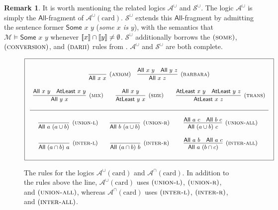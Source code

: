 \documentclass[letterpaper]{article} %
\theoremstyle{definition}
\newtheorem{remark}[theorem]{Remark}
\newcommand{\semantics}[1]{[\![\mbox{\em $ #1 $\/}]\!]}
\newcommand{\Model}{\mathcal{M}}
\newcommand{\Aunion}{\mathscr{A}^{\cup}}
\newcommand{\Sunion}{\mathscr{S}^{\cup}}
\newcommand{\Ainter}{\mathscr{A}^{\cap}}
\newcommand{\proverule}{\textsc}
\newcommand{\axiom}{\proverule{axiom}}
\newcommand{\barbara}{\proverule{barbara}}
\newcommand{\unionl}{\proverule{union-l}}
\newcommand{\unionr}{\proverule{union-r}}
\newcommand{\unionall}{\proverule{union-all}}
\newcommand{\interl}{\proverule{inter-l}}
\newcommand{\interr}{\proverule{inter-r}}
\newcommand{\interall}{\proverule{inter-all}}
\newcommand{\some}{\proverule{some}}
\newcommand{\conversion}{\proverule{conversion}}
\newcommand{\darii}{\proverule{darii}}
\newcommand{\mix}{\proverule{mix}}
\newcommand{\size}{\proverule{size}}
\newcommand{\trans}{\proverule{trans}}
\newcommand{\All}[2]{\mathsf{All}\,\,#1\,\,#2}
\newcommand{\Some}[2]{\mathsf{Some}\,\,#1\,\,#2}
\newcommand{\Atleast}[2]{\mathsf{AtLeast}\,\,#1\,\,#2}
\newcommand{\AllNoArgs}{\mathsf{All}}
\newcommand{\card}{\mathrm{card}}
\begin{document}
\begin{remark}
It is worth mentioning the related logics $\Aunion$ and $\Sunion$.  The logic $\Aunion$ is simply the $\AllNoArgs$-fragment of $\Aunion(\card)$.  $\Sunion$ extends this $\AllNoArgs$-fragment by admitting the sentence former $\Some{x}{y}$ (\emph{some $x$ is $y$}), with the semantics that $\Model \models \Some{x}{y}$ whenever $\semantics{x} \cap \semantics{y} \ne \emptyset$.  $\Sunion$ additionally 
borrows the $(\some)$, $(\conversion)$, and $(\darii)$ rules
from \cite{syllogistic_cardinality_comparisons}. 
$\Aunion$ and $\Sunion$ are both complete. 


\label{remark-related-logics}
\end{remark}

\begin{figure*}[t!]
\begin{equation*}
\boxed{
\small
\begin{array}{c}
\begin{array}{ccc}
\\ 
\infer[(\axiom)]
    {\All{x}{x}}
    {} &
\infer[(\barbara)]
    {\All{x}{z}}
    {\All{x}{y} & \All{y}{z}}
\end{array}
\\ \\ 
\begin{array}{ccc}
\infer[(\mix)]
    {\All{y}{x}}
    {\All{x}{y} & \Atleast{x}{y}} &
\infer[(\size)]
    {\Atleast{y}{x}}
    {\All{x}{y}} &

\infer[(\trans)]
    {\Atleast{x}{z}}
    {\Atleast{x}{y} & \Atleast{y}{z}} \\ \\
    \hline \\
    
\infer[(\unionl)]
    {\All{a}{(a\cup b)}}
    {} &
    \infer[(\unionr)]
    {\All{b}{(a\cup b)}}
    {} &
\infer[(\unionall)]
    {\All{(a\cup b)}{c}}
    {\All{a}{c} & \All{b}{c}} \\ \\

\infer[(\interl)]
    {\All{(a\cap b)}{a}}
    {} &
\infer[(\interr)]
    {\All{(a\cap b)}{b}}
    {} &
\infer[(\interall)]
    {\All{a}{(b\cap c)}}
    {\All{a}{b} & \All{a}{c}} \\ \\
    
\end{array}
\end{array}
}
\end{equation*}
\caption{The rules for the logics $\Aunion(\card)$ and $\Ainter(\card)$.  
In addition to the rules above the line, $\Aunion(\card)$ uses $(\unionl)$, $(\unionr)$, and $(\unionall)$, whereas $\Ainter(\card)$ uses $(\interl)$, $(\interr)$, and $(\interall)$.
\label{fig-rules}}
\end{figure*}
\end{document}
